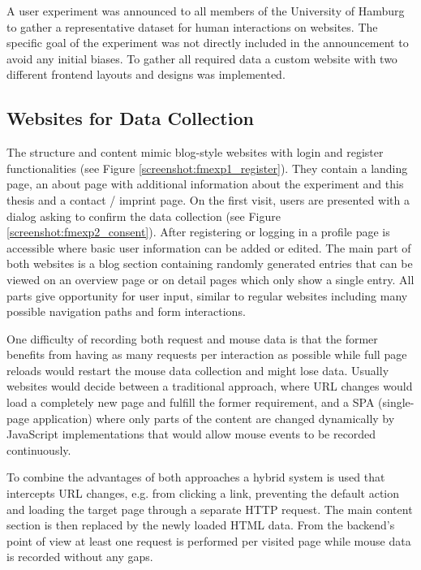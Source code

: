 \documentclass[
    fontsize=12pt,
    headings=small,
    parskip=half,           %
    bibliography=totoc,
    numbers=noenddot,       %
    open=any,               %
    final,                   %
    table
]{scrreprt}
\begin{document}
A user experiment was announced to all members of the University of Hamburg to gather a representative dataset for human interactions on websites. The specific goal of the experiment was not directly included in the announcement to avoid any initial biases. To gather all required data a custom website with two different frontend layouts and designs was implemented.

\label{concept_websites}
\subsection{Websites for Data Collection}

The structure and content mimic blog-style websites with login and register functionalities (see Figure \ref{screenshot:fmexp1_register}). They contain a landing page, an about page with additional information about the experiment and this thesis and a contact / imprint page. On the first visit, users are presented with a dialog asking to confirm the data collection (see Figure \ref{screenshot:fmexp2_consent}). After registering or logging in a profile page is accessible where basic user information can be added or edited. The main part of both websites is a blog section containing randomly generated entries that can be viewed on an overview page or on detail pages which only show a single entry.
All parts give opportunity for user input, similar to regular websites including many possible navigation paths and form interactions.

One difficulty of recording both request and mouse data is that the former benefits from having as many requests per interaction as possible while full page reloads would restart the mouse data collection and might lose data. Usually websites would decide between a traditional approach, where URL changes would load a completely new page and fulfill the former requirement, and a SPA (single-page application) where only parts of the content are changed dynamically by JavaScript implementations that would allow mouse events to be recorded continuously.

To combine the advantages of both approaches a hybrid system is used that intercepts URL changes, e.g. from clicking a link, preventing the default action and loading the target page through a separate HTTP request. The main content section is then replaced by the newly loaded HTML data. From the backend's point of view at least one request is performed per visited page while mouse data is recorded without any gaps.
\end{document}
